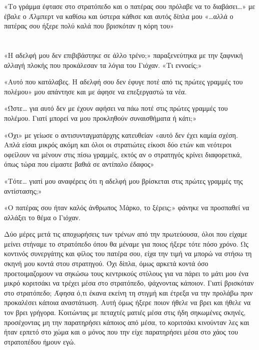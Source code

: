 \documentclass[12pt,twoside, openany]{book}
\begin{document}
«Το γράμμα έφτασε στο στρατόπεδο και ο πατέρας σου πρόλαβε να το διαβάσει…» με έβαλε ο Άλμπερτ να καθίσω και ύστερα κάθισε και αυτός δίπλα μου «…αλλά ο πατέρας σου ήξερε πολύ καλά που βρισκόταν η κόρη του»


\chapter{}


«Η αδελφή μου δεν επιβιβάστηκε σε άλλο τρένο;» παραξενεύτηκα με την ξαφνική αλλαγή πλοκής που προκάλεσαν τα λόγια του Γιόχαν. «Τι εννοείς;»

«Αυτό που κατάλαβες. Η αδελφή σου δεν έφυγε ποτέ από τις πρώτες γραμμές του πολέμου» μου απάντησε και με άφησε να επεξεργαστώ τα νέα.

«Ώστε… για αυτό δεν με έχουν αφήσει να πάω ποτέ στις πρώτες γραμμές του πολέμου. Γιατί μπορεί να μου προκληθούν συναισθήματα ή κάτι;»

«Όχι» με γείωσε ο αντισυνταγματάρχης κατευθείαν «αυτό δεν έχει καμία σχέση. Απλά είσαι μικρός ακόμη και όλοι οι στρατιώτες είκοσι δύο ετών και νεότεροι οφείλουν να μένουν στις πίσω γραμμές, εκτός αν ο στρατηγός κρίνει διαφορετικά, όπως τώρα που είμαστε βαθιά σε αντίπαλο έδαφος»

«Τότε… γιατί μου αναφέρεις ότι η αδελφή μου βρίσκεται στις πρώτες γραμμές της αντίστασης;»

«Ο πατέρας σου ήταν καλός άνθρωπος Μάρκο, το ξέρεις;» φάνηκε να προσπαθεί να αλλάξει το θέμα ο Γιόχαν.\newline\newline

Δύο μέρες μετά τις αποχωρήσεις των τρένων από την πρωτεύουσα, όλοι που είχαμε μείνει στήναμε το στρατόπεδο όπου θα μέναμε για ποιος ήξερε τότε πόσο χρόνο. Ως κοντινός συνεργάτης και φίλος του πατέρα σου, είχα την τιμή να μπορώ να στήσω τη σκηνή μου κοντά στου στρατηγού. Όχι δίπλα, όμως αρκετά κοντά όσο προετοιμαζομουν να σηκώσω τους κεντρικούς στύλους για να πάρει το μάτι μου ένα μικρό κοριτσάκι να τρέχει μέσα στο στρατόπεδο, ψάχνοντας κάποιον. Γιατί βρισκόταν στο στρατόπεδο; Άφησα ό,τι έκανα εκείνη τη στιγμή και έτρεξα να την προλάβω πριν προκαλέσει κάποια αναστάτωση. Αυτή όμως ήξερε ποιον ήθελε να βρει και ήθελε να τον βρει γρήγορα. Κοιτώντας με πεταχτές ματιές μέσα στις ήδη σηκωμένες σκηνές, προσέχοντας μη την παρατηρήσει κάποιος από μέσα, το κοριτσάκι κινούνταν λες και ήταν ερπετό στο χώμα και ο μόνος που την είχε παρατηρήσει μέσα στο χάος του στρατοπέδου ήμουν εγώ.
\end{document}
